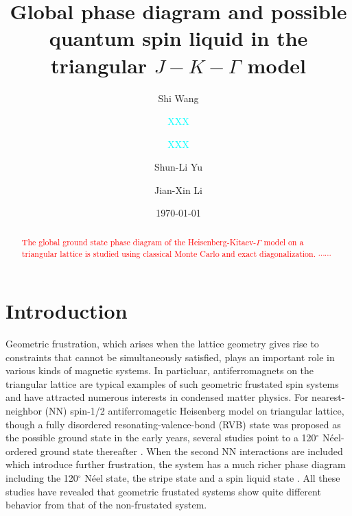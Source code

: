 \documentclass[aps,prb,reprint,amsfonts,amsmath,amssymb,showpacs,groupedaddress,superscriptaddress]{revtex4-1}
\begin{document}
\title{Global phase diagram and possible quantum spin liquid in the triangular $J-K-\Gamma$ model}

\author{Shi Wang}

\author{\textcolor{cyan}{XXX}}
\affiliation{\textcolor{cyan}{XXX}}

\author{\textcolor{cyan}{XXX}}
\affiliation{\textcolor{cyan}{XXX}}

\author{Shun-Li Yu}

\author{Jian-Xin Li}

\date{\today}

\begin{abstract}
\textcolor{red}{The global ground state phase diagram of the Heisenberg-Kitaev-$\Gamma$ model on a triangular lattice is studied using classical Monte Carlo and exact diagonalization. $\cdots \cdots$}
\end{abstract}

\maketitle

\section{\label{sec:SectionI}Introduction}
Geometric frustration, which arises when the lattice geometry gives rise to constraints that cannot be simultaneously satisfied, plays an important role in various kinds of magnetic systems. In particluar, antiferromagnets on the triangular lattice are typical examples of such geometric frustated spin systems and have attracted numerous interests in condensed matter physics. For nearest-neighbor (NN) spin-1/2 antiferromagetic Heisenberg model on triangular lattice, though a fully disordered resonating-valence-bond (RVB) \cite{Anderson1973} state was proposed as the possible ground state in the early years, several studies point to a 120$^\circ$ N\'{e}el-ordered ground state thereafter \cite{PhysRevLett.99.127004,PhysRevLett.82.3899,PhysRevB.50.10048,PhysRevLett.60.2531}. When the second NN interactions are included which introduce further frustration, the system has a much richer phase diagram including the 120$^\circ$ N\'{e}el state, the stripe state and a spin liquid state \cite{PhysRevB.91.014426,PhysRevB.92.041105,PhysRevB.92.140403,PhysRevB.96.165141,PhysRevB.93.144411,JPSJ.83.093707,PhysRevB.96.075116,PhysRevB.94.121111}. All these studies have revealed that geometric frustated systems show quite different behavior from that of the non-frustated system.
\end{document}
